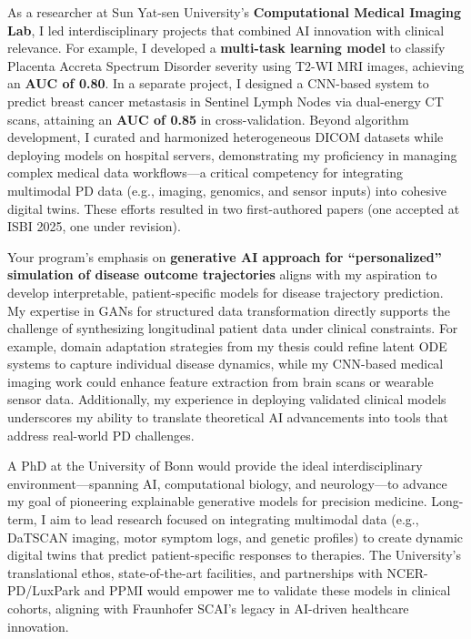 \documentclass[11pt,a4paper, final]{moderncv}
\begin{document}
As a researcher at Sun Yat-sen University's \textbf{Computational Medical Imaging Lab}, 
I led interdisciplinary projects that combined AI innovation with clinical relevance. 
For example, I developed a \textbf{multi-task learning model} to 
classify Placenta Accreta Spectrum Disorder severity using T2-WI MRI images, achieving an \textbf{AUC of 0.80}. 
In a separate project, 
I designed a CNN-based system to predict breast cancer metastasis in Sentinel Lymph Nodes via dual-energy CT scans, 
attaining an \textbf{AUC of 0.85} in cross-validation. 
Beyond algorithm development, I curated and harmonized heterogeneous DICOM datasets while deploying models on hospital servers, 
demonstrating my proficiency in managing complex medical data workflows—a critical competency for integrating multimodal PD data (e.g., imaging, genomics, and sensor inputs) into cohesive digital twins. 
These efforts resulted in two first-authored papers (one accepted at ISBI 2025, one under revision).

Your program's emphasis on \textbf{generative AI approach for “personalized” simulation of disease outcome trajectories} 
aligns with my aspiration to develop interpretable, patient-specific models for disease trajectory prediction. 
My expertise in GANs for structured data transformation directly supports the challenge of synthesizing longitudinal patient data under clinical constraints. 
For example, domain adaptation strategies from my thesis could refine latent ODE systems to capture individual disease dynamics, while my CNN-based medical imaging work could enhance feature extraction from brain scans or wearable sensor data. 
Additionally, my experience in deploying validated clinical models underscores my ability to translate theoretical AI advancements into tools that address real-world PD challenges.

A PhD at the University of Bonn would provide the ideal interdisciplinary environment—spanning AI, computational biology, and neurology—to advance my goal of pioneering explainable generative models for precision medicine. 
Long-term, I aim to lead research focused on integrating multimodal data (e.g., DaTSCAN imaging, motor symptom logs, and genetic profiles) to create dynamic digital twins that predict patient-specific responses to therapies. 
The University's translational ethos, state-of-the-art facilities, and partnerships with NCER-PD/LuxPark and PPMI would empower me to validate these models in clinical cohorts, aligning with Fraunhofer SCAI's legacy in AI-driven healthcare innovation.
\end{document}
